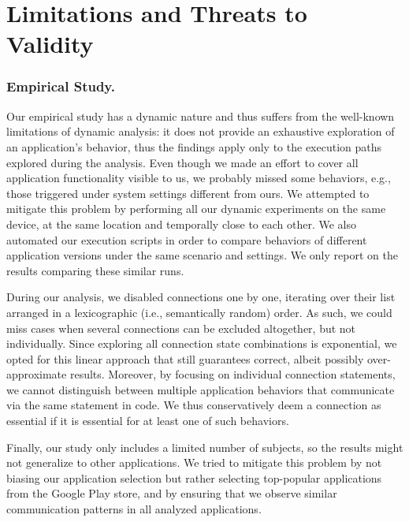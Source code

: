 \vspace{0.05in}
\section{Limitations and Threats to \\Validity}
\label{sec:limitations}

\subsubsection{Empirical Study.}
Our empirical study has a dynamic nature and thus suffers from the well-known limitations of dynamic analysis: it does not provide an exhaustive exploration of an application's behavior, thus the findings apply only to the execution paths explored during the analysis. 
Even though we made an effort to cover all application functionality visible to us, we probably missed some behaviors, e.g., those triggered under system settings different from ours. 
We attempted to mitigate this problem by performing all our dynamic experiments on the same device, at the same location and temporally close to each other.  
We also automated our execution scripts in order to compare behaviors of different application versions under the same scenario and settings. 
We only report on the results comparing these similar runs.  

During our analysis, we disabled connections one by one, iterating over their list arranged in a lexicographic (i.e., semantically random) order. As such, we could miss cases when 
several connections can be excluded altogether, but not individually. 
Since exploring all connection state combinations is exponential, we opted for this linear approach that still guarantees correct, 
albeit possibly over-approximate results. Moreover, by focusing on individual connection statements, we cannot distinguish between multiple application behaviors
that communicate via the same statement in code. We thus conservatively deem a connection as essential if it is essential for at least one of such behaviors. 
 
Finally, our study only includes a limited number of subjects, so the results might not generalize to other applications.
We tried to mitigate this problem by not biasing our application selection but rather selecting top-popular applications from the Google Play store, and by ensuring that we observe similar communication patterns in all analyzed applications.

